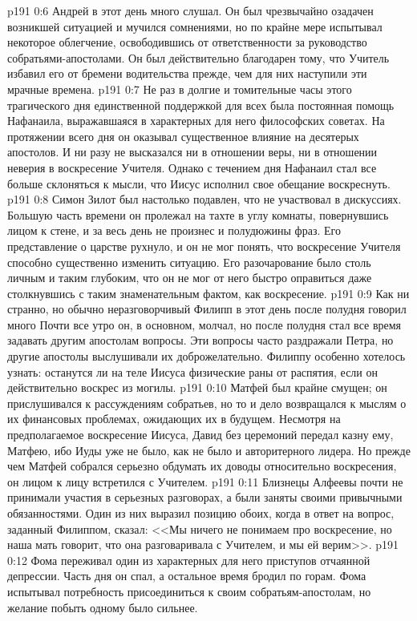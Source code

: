 \vs p191 0:6 Андрей в этот день много слушал. Он был чрезвычайно озадачен возникшей ситуацией и мучился сомнениями, но по крайне мере испытывал некоторое облегчение, освободившись от ответственности за руководство собратьями\hyp{}апостолами. Он был действительно благодарен тому, что Учитель избавил его от бремени водительства прежде, чем для них наступили эти мрачные времена.
\vs p191 0:7 Не раз в долгие и томительные часы этого трагического дня единственной поддержкой для всех была постоянная помощь Нафанаила, выражавшаяся в характерных для него философских советах. На протяжении всего дня он оказывал существенное влияние на десятерых апостолов. И ни разу не высказался ни в отношении веры, ни в отношении неверия в воскресение Учителя. Однако с течением дня Нафанаил стал все больше склоняться к мысли, что Иисус исполнил свое обещание воскреснуть.
\vs p191 0:8 Симон Зилот был настолько подавлен, что не участвовал в дискуссиях. Большую часть времени он пролежал на тахте в углу комнаты, повернувшись лицом к стене, и за весь день не произнес и полудюжины фраз. Его представление о царстве рухнуло, и он не мог понять, что воскресение Учителя способно существенно изменить ситуацию. Его разочарование было столь личным и таким глубоким, что он не мог от него быстро оправиться даже столкнувшись с таким знаменательным фактом, как воскресение.
\vs p191 0:9 Как ни странно, но обычно неразговорчивый Филипп в этот день после полудня говорил много Почти все утро он, в основном, молчал, но после полудня стал все время задавать другим апостолам вопросы. Эти вопросы часто раздражали Петра, но другие апостолы выслушивали их доброжелательно. Филиппу особенно хотелось узнать: останутся ли на теле Иисуса физические раны от распятия, если он действительно воскрес из могилы.
\vs p191 0:10 Матфей был крайне смущен; он прислушивался к рассуждениям собратьев, но то и дело возвращался к мыслям о их финансовых проблемах, ожидающих их в будущем. Несмотря на предполагаемое воскресение Иисуса, Давид без церемоний передал казну ему, Матфею, ибо Иуды уже не было, как не было и авторитерного лидера. Но прежде чем Матфей собрался серьезно обдумать их доводы относительно воскресения, он лицом к лицу встретился с Учителем.
\vs p191 0:11 Близнецы Алфеевы почти не принимали участия в серьезных разговорах, а были заняты своими привычными обязанностями. Один из них выразил позицию обоих, когда в ответ на вопрос, заданный Филиппом, сказал: <<Мы ничего не понимаем про воскресение, но наша мать говорит, что она разговаривала с Учителем, и мы ей верим>>.
\vs p191 0:12 Фома переживал один из характерных для него приступов отчаянной депрессии. Часть дня он спал, а остальное время бродил по горам. Фома испытывал потребность присоединиться к своим собратьям\hyp{}апостолам, но желание побыть одному было сильнее.
